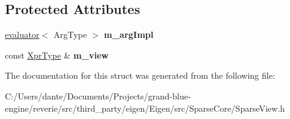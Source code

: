 \subsection*{Protected Attributes}
\begin{DoxyCompactItemize}
\item 
\mbox{\label{struct_eigen_1_1internal_1_1unary__evaluator_3_01_sparse_view_3_01_arg_type_01_4_00_01_index_based_01_4_a66aee561c1e582033bcd82488a9b2533}} 
\mbox{\hyperlink{struct_eigen_1_1internal_1_1evaluator}{evaluator}}$<$ Arg\+Type $>$ {\bfseries m\+\_\+arg\+Impl}
\item 
\mbox{\label{struct_eigen_1_1internal_1_1unary__evaluator_3_01_sparse_view_3_01_arg_type_01_4_00_01_index_based_01_4_a0c13bc4f8d17a46db079978ee2faf955}} 
const \mbox{\hyperlink{class_eigen_1_1_sparse_view}{Xpr\+Type}} \& {\bfseries m\+\_\+view}
\end{DoxyCompactItemize}


The documentation for this struct was generated from the following file\+:\begin{DoxyCompactItemize}
\item 
C\+:/\+Users/dante/\+Documents/\+Projects/grand-\/blue-\/engine/reverie/src/third\+\_\+party/eigen/\+Eigen/src/\+Sparse\+Core/Sparse\+View.\+h\end{DoxyCompactItemize}
